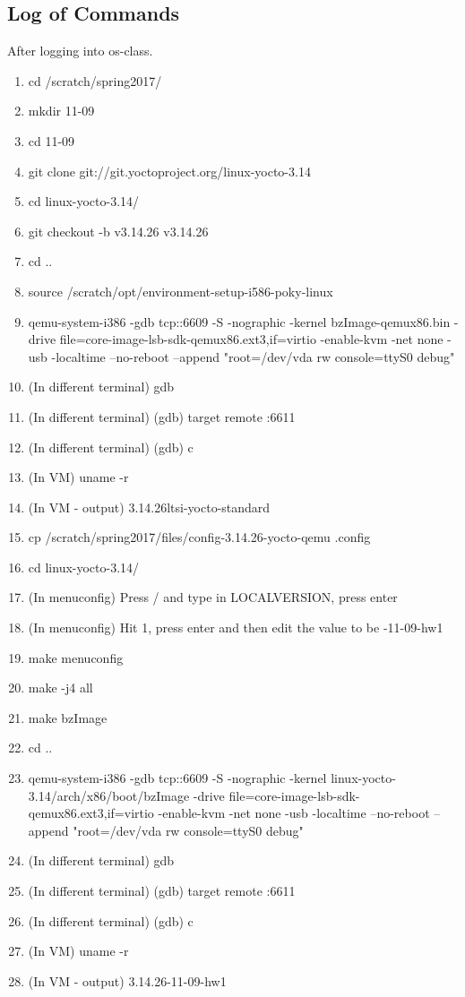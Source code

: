 \documentclass[draftclsnofoot, onecolumn, 10pt]{IEEEtran}
\begin{document}
\subsection{Log of Commands}
After logging into os-class.
\begin{enumerate}
\item cd /scratch/spring2017/
\item mkdir 11-09
\item cd 11-09
\item git clone git://git.yoctoproject.org/linux-yocto-3.14
\item cd linux-yocto-3.14/
\item git checkout -b v3.14.26 v3.14.26
\item cd ..
\item source /scratch/opt/environment-setup-i586-poky-linux
\item qemu-system-i386 -gdb tcp::6609 -S -nographic -kernel bzImage-qemux86.bin -drive file=core-image-lsb-sdk-qemux86.ext3,if=virtio -enable-kvm -net none -usb -localtime --no-reboot --append "root=/dev/vda rw console=ttyS0 debug"
\item (In different terminal) gdb
\item (In different terminal) (gdb) target remote :6611
\item (In different terminal) (gdb) c
\item (In VM) uname -r
\item (In VM - output) 3.14.26ltsi-yocto-standard
\item cp /scratch/spring2017/files/config-3.14.26-yocto-qemu .config
\item cd linux-yocto-3.14/
\item (In menuconfig) Press / and type in LOCALVERSION, press enter
\item (In menuconfig) Hit 1, press enter and then edit the value to be -11-09-hw1
\item make menuconfig
\item make -j4 all
\item make bzImage
\item cd ..
\item qemu-system-i386 -gdb tcp::6609 -S -nographic -kernel linux-yocto-3.14/arch/x86/boot/bzImage -drive file=core-image-lsb-sdk-qemux86.ext3,if=virtio -enable-kvm -net none -usb -localtime --no-reboot --append "root=/dev/vda rw console=ttyS0 debug"
\item (In different terminal) gdb
\item (In different terminal) (gdb) target remote :6611
\item (In different terminal) (gdb) c
\item (In VM) uname -r
\item (In VM - output) 3.14.26-11-09-hw1
\end{enumerate}
\end{document}
